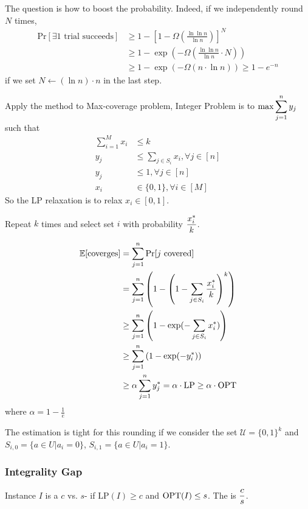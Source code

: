 The question is how to boost the probability. Indeed, if we independently round  $ N  $ times, 
\begin{align*}
    \mathrm{Pr}[\exists 1\text{ trial succeeds}]& \geq 1-[1-\Omega(\frac{\ln\ln n}{\ln n})]^N\\
    & \geq 1-\exp(-\Omega(\frac{\ln\ln n}{\ln n}\cdot N))\\
    & \geq 1-\exp(-\Omega(n\cdot\ln n)) \geq 1-e^{-n}
\end{align*}
if we set  $ N\leftarrow (\ln n)\cdot n $ in the last step.

Apply the method to Max-coverage problem, Integer Problem is to  $\max \displaystyle\sum_{j=1}^n y_j$ such that 
\begin{align*}
    \sum_{i=1}^M x_i &\leq k\\
    y_j& \leq \sum_{j\in S_i}x_i,\forall j\in [n]\\
    y_j& \leq 1,\forall j\in [n]\\
    x_i&\in\{0,1\},\forall i\in [M]
\end{align*} 
So the LP relaxation is to relax  $ x_i\in [0,1] $. 

Repeat  $ k  $ times and select set  $ i  $ with probability  $ \displaystyle\frac{x_i^*}{k} $.

\begin{align*}
    \mathbb E[\text{coverges}]& =\sum_{j=1}^n\mathrm{Pr}[j\text{ covered}]\\
    &=\sum_{j=1}^n\left(1-\left(1-\sum_{j\in S_i}\frac{x_i^*}{k}\right)^k\right)\\
    & \geq \sum_{j=1}^n\left(1-\exp(-\sum_{j\in S_i}x_i^*)\right)\\
    & \geq \sum_{j=1}^n\left(1-\exp(-y_i^*)\right)\\
    & \geq \alpha\sum_{j=1}^n y_j^*=\alpha\cdot \mathrm{LP} \geq \alpha\cdot \mathrm{OPT}
\end{align*}
where  $ \alpha=1-\frac{1}{e} $ 

The estimation is tight for this rounding if we consider the set  $ \mathcal{U}=\{0,1\}^k $ and  $ S_{i,0}=\{a\in U|a_i=0\} $,  $ S_{i,1}=\{a\in U|a_i=1\} $.   


\subsubsection{Integrality Gap}
Instance  $ I  $ is a  $ c $ vs.  $ s $- if  $ \mathrm{LP}(I) \geq c $ and  $ \mathrm{OPT}(I) \leq s $. The  is  $\displaystyle \frac{c}{s} $. 

